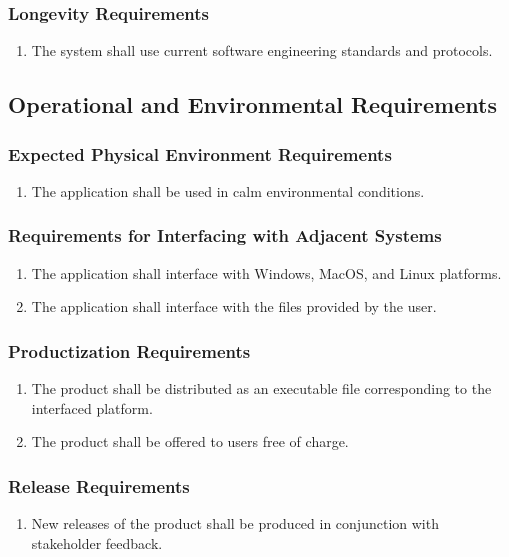 \documentclass{article}
\begin{document}
\subsubsection{Longevity Requirements}
\begin{enumerate}[LOR1]
    \item The system shall use current software engineering standards and protocols.
\end{enumerate}

\subsection{Operational and Environmental Requirements}
\subsubsection{Expected Physical Environment Requirements}
\begin{enumerate}[EPE1]
    \item The application shall be used in calm environmental conditions.
\end{enumerate}

\subsubsection{Requirements for Interfacing with Adjacent Systems}
\begin{enumerate}[R{I}{A}1]
    \item The application shall interface with Windows, MacOS, and Linux platforms.
    \item The application shall interface with the files provided by the user.
\end{enumerate}

\subsubsection{Productization Requirements}
\begin{enumerate}[PRO1]
    \item The product shall be distributed as an executable file corresponding to the interfaced platform.
    \item The product shall be offered to users free of charge.
\end{enumerate}

\subsubsection{Release Requirements}
\begin{enumerate}[RR1]
    \item New releases of the product shall be produced in conjunction with stakeholder feedback.
\end{enumerate}
\end{document}
